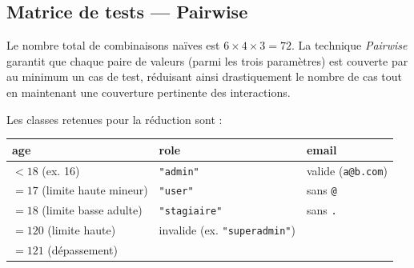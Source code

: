\documentclass[11pt,a4paper]{article}
\begin{document}
\subsection{Matrice de tests --- Pairwise}

Le nombre total de combinaisons naïves est $6 \times 4 \times 3 = 72$.
La technique \emph{Pairwise} garantit que chaque paire de valeurs (parmi les trois paramètres)
est couverte par au minimum un cas de test, réduisant ainsi drastiquement le nombre de cas
tout en maintenant une couverture pertinente des interactions.

Les classes retenues pour la réduction sont :

\begin{center}
\begin{tabular}{lll}
\toprule
\textbf{age} & \textbf{role} & \textbf{email} \\
\midrule
$< 18$ (ex. 16) & \texttt{"admin"} & valide (\texttt{a@b.com}) \\
$= 17$ (limite haute mineur) & \texttt{"user"} & sans \texttt{@} \\
$= 18$ (limite basse adulte) & \texttt{"stagiaire"} & sans \texttt{.} \\
$= 120$ (limite haute) & invalide (ex. \texttt{"superadmin"}) & \\
$= 121$ (dépassement) & & \\
\bottomrule
\end{tabular}
\end{center}

\bigskip
\end{document}
